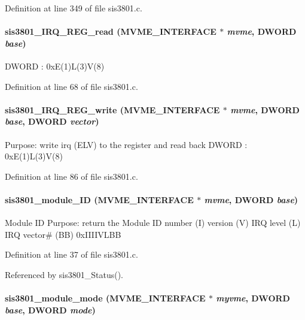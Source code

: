 Definition at line 349 of file sis3801.c.
\paragraph[{sis3801\_\-IRQ\_\-REG\_\-read}]{ sis3801\_\-IRQ\_\-REG\_\-read ({\bf MVME\_\-INTERFACE} $\ast$ {\em mvme}, \/  {\bf DWORD} {\em base})}\hfill\label{sis3801_8h_ab295ea2c9698fe3a0143103b696609d2}
DWORD : 0xE(1)L(3)V(8) 

Definition at line 68 of file sis3801.c.
\paragraph[{sis3801\_\-IRQ\_\-REG\_\-write}]{ sis3801\_\-IRQ\_\-REG\_\-write ({\bf MVME\_\-INTERFACE} $\ast$ {\em mvme}, \/  {\bf DWORD} {\em base}, \/  {\bf DWORD} {\em vector})}\hfill\label{sis3801_8h_a96c6849156112f3100be773221887e76}
Purpose: write irq (ELV) to the register and read back DWORD : 0xE(1)L(3)V(8) 

Definition at line 86 of file sis3801.c.
\paragraph[{sis3801\_\-module\_\-ID}]{ sis3801\_\-module\_\-ID ({\bf MVME\_\-INTERFACE} $\ast$ {\em mvme}, \/  {\bf DWORD} {\em base})}\hfill\label{sis3801_8h_ae898609aaf567d5366587e8e719bdf52}
Module ID Purpose: return the Module ID number (I) version (V) IRQ level (L) IRQ vector\# (BB) 0xIIIIVLBB 

Definition at line 37 of file sis3801.c.

Referenced by sis3801\_\-Status().
\paragraph[{sis3801\_\-module\_\-mode}]{ sis3801\_\-module\_\-mode ({\bf MVME\_\-INTERFACE} $\ast$ {\em myvme}, \/  {\bf DWORD} {\em base}, \/  {\bf DWORD} {\em mode})}\hfill\label{sis3801_8h_a699de6e698bb226b1879b726dab1641e}
